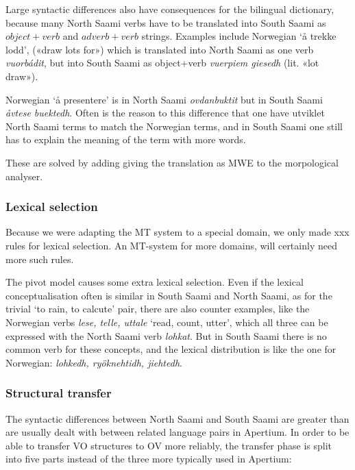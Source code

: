 \documentclass[a4paper,11pt,twocolumn]{article}
\begin{document}
Large syntactic differences also have consequences for the bilingual dictionary, because many North Saami verbs have to be translated into South Saami as $object+verb$ and $adverb+verb$ strings. Examples include Norwegian `å trekke lodd', («draw lots for») which is translated into North Saami as one verb \textit{vuorbádit}, but into South Saami as object+verb \textit{vuerpiem giesedh} (lit. «lot draw»).
  
Norwegian `å presentere' is in North Saami \textit{ovdanbuktit} but in South Saami \textit{åvtese buektedh}. Often is the reason to this difference that one have utviklet North Saami terms to match the Norwegian terms, and in South Saami one still has to explain the meaning of the term with more words.

These are solved by adding giving the translation as MWE to the morpological analyser.



\subsubsection{Lexical selection}
Because we were adapting the MT system to a special domain, we only made xxx rules for lexical selection. An MT-system for more domains, will certainly need more such rules. 

The pivot model causes some extra lexical selection. Even if the lexical conceptualisation often is similar in South Saami and North Saami, as for the trivial ‘to rain, to calcute’ pair, there are also counter examples, like the Norwegian verbs \textit{lese, telle, uttale} ‘read, count, utter’, which all three can be expressed with the North Saami verb \textit{lohkat}. But in South Saami there is no common verb for these concepts, and the lexical distribution is like the one for Norwegian: \textit{lohkedh, ryöknehtidh, jiehtedh}. 


\subsubsection{Structural transfer}

The syntactic differences between North Saami and South Saami are
greater than are usually dealt with between related language pairs
in Apertium. 
In order to be able to transfer VO structures to OV more reliably,
the transfer phase is split into five parts instead of the three
more typically used in Apertium:

\end{document}
